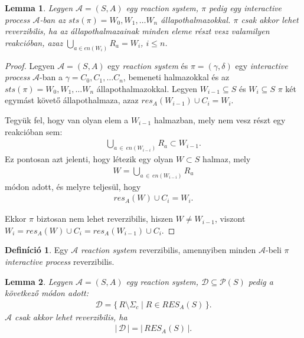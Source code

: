 \documentclass[12pt]{article}
\theoremstyle{definition}
\newtheorem*{definition*}{Definíció}
\theoremstyle{remark}
\theoremstyle{plain}
\theoremstyle{plain}
\newtheorem*{lemma*}{Lemma}
\newcommand{\res}{\textit{res}}
\begin{document}
    \begin{lemma*}
        Legyen $\mathscr{A} = (S, A)$ egy \textit{reaction system}, $\pi$ pedig egy \textit{interactive process} $\mathscr{A}$-ban az $\textit{sts}(\pi)=W_{0},W_{1},\ldots W_{n}$ állapothalmazokkal. $\pi$ csak akkor lehet reverzibilis, ha az állapothalmazainak minden eleme részt vesz valamilyen reakcióban, azaz $\bigcup_{a \in \textit{en}(W_{i})} R_{a} = W_{i}$, $i \leq n$.
    \end{lemma*}

    \begin{proof}
        Legyen $\mathscr{A} = (S, A)$ egy \textit{reaction system} és $\pi=(\gamma, \delta)$ egy \textit{interactive process} $\mathscr{A}$-ban a $\gamma = C_{0}, C_{1}, \ldots C_{n}$, bemeneti halmazokkal és az $\textit{sts}(\pi)=W_{0},W_{1},\ldots W_{n}$ állapothalmazokkal. Legyen $W_{i - 1} \subseteq S$ és $W_{i} \subseteq S$ $\pi$ két egymást követő állapothalmaza, azaz $\res_{A}(W_{i-1}) \cup C_{i}=W_{i}$.
        
        Tegyük fel, hogy van olyan elem a $W_{i-1}$ halmazban, mely nem vesz részt egy reakcióban sem:
        \begin{align*}
            \bigcup_{a \,\in\, \textit{en}(W_{i-i})} R_{a} \subset W_{i-1}.
        \end{align*}
        Ez pontosan azt jelenti, hogy létezik egy olyan $W \subset S$ halmaz, mely
        \begin{align*}
            W = \bigcup_{a \,\in\, \textit{en}(W_{i-i})} R_{a}
        \end{align*}
        módon adott, és melyre teljesül, hogy
        \begin{align*}
            \res_{A}(W) \cup C_{i} = W_{i}.
        \end{align*}

        Ekkor $\pi$ biztosan nem lehet reverzibilis, hiszen $W \neq W_{i - 1}$, viszont $W_{i} = \res_{A}(W) \cup C_{i} = \res_{A}(W_{i - 1}) \cup C_{i}$.
    \end{proof}

    \begin{definition*}
        Egy $\mathscr{A}$ \textit{reaction system} reverzibilis, amennyiben minden $\mathscr{A}$-beli $\pi$ \textit{interactive process} reverzibilis.
    \end{definition*}

    \begin{lemma*}
        Legyen $\mathscr{A} = (S, A)$ egy \textit{reaction system}, $\mathcal{D} \subseteq \mathcal{P}(S)$ pedig a következő módon adott:
        \begin{align*}
            \mathcal{D} = \{ \, R \setminus \Sigma_{c} \mid R \in \textit{RES}_{A}(S) \, \}.
        \end{align*}
        $\mathscr{A}$ csak akkor lehet reverzibilis, ha
        \begin{align*}
            |\,\mathcal{D}\,| = |\,\textit{RES}_{A}(S)\,|.
        \end{align*}
    \end{lemma*}
\end{document}
